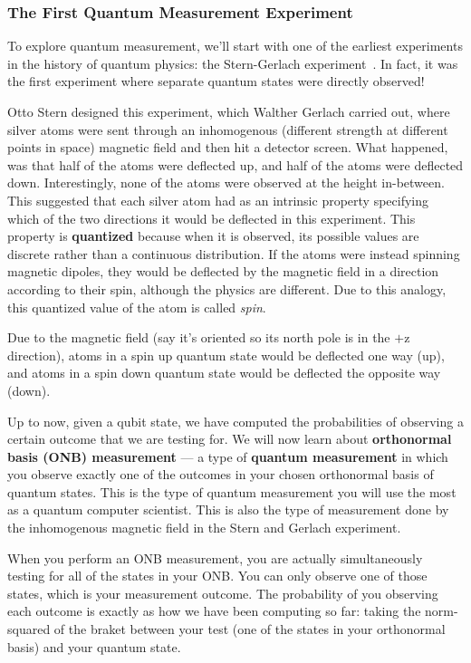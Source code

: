 \documentclass{article}
\theoremstyle{definition}
\begin{document}
\subsubsection{The First Quantum Measurement Experiment}
To explore quantum measurement, we'll start with one of the earliest experiments in the history of quantum physics: the Stern-Gerlach experiment~\cite{Gerlach_Stern_1922}.  In fact, it was the first experiment where separate quantum states were directly observed!

Otto Stern designed this experiment, which Walther Gerlach carried out, where silver atoms were sent through an inhomogenous (different strength at different points in space) magnetic field and then hit a detector screen.  What happened, was that half of the atoms were deflected up, and half of the atoms were deflected down.  Interestingly, none of the atoms were observed at the height in-between.  This suggested that each silver atom had as an intrinsic property specifying which of the two directions it would be deflected in this experiment.  This property is \textbf{quantized} because when it is observed, its possible values are discrete rather than a continuous distribution.  If the atoms were instead spinning magnetic dipoles, they would be deflected by the magnetic field in a direction according to their spin, although the physics are different.  Due to this analogy, this quantized value of the atom is called \textit{spin}.

Due to the magnetic field (say it's oriented so its north pole is in the $+$z direction), atoms in a spin up quantum state would be deflected one way (up), and atoms in a spin down quantum state would be deflected the opposite way (down).

Up to now, given a qubit state, we have computed the probabilities of observing a certain outcome that we are testing for.  We will now learn about \textbf{orthonormal basis (ONB) measurement} --- a type of \textbf{quantum measurement} in which you observe exactly one of the outcomes in your chosen orthonormal basis of quantum states.  This is the type of quantum measurement you will use the most as a quantum computer scientist.  This is also the type of measurement done by the inhomogenous magnetic field in the Stern and Gerlach experiment.

When you perform an ONB measurement, you are actually simultaneously testing for all of the states in your ONB.  You can only observe one of those states, which is your measurement outcome.  The probability of you observing each outcome is exactly as how we have been computing so far: taking the norm-squared of the braket between your test (one of the states in your orthonormal basis) and your quantum state.
\end{document}
